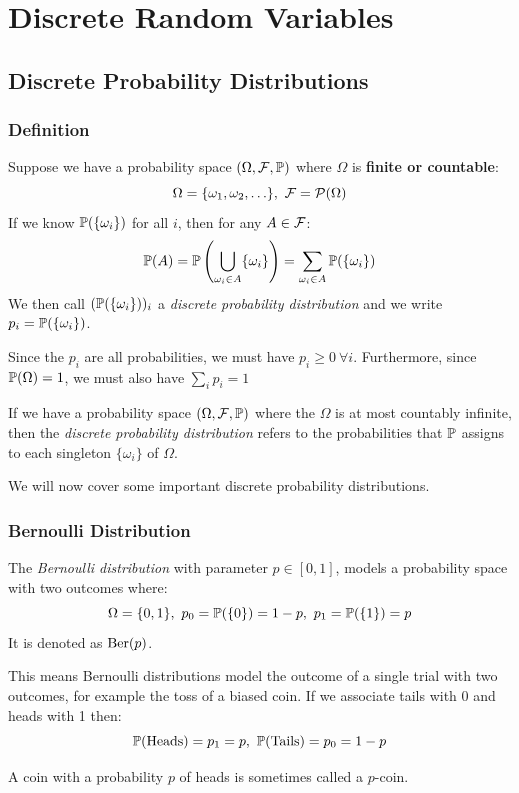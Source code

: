 \documentclass[../main.tex]{subfiles}
\begin{document}
\chapter{Discrete Random Variables}
\section{Discrete Probability Distributions}
\subsection{Definition}
\begin{definition}
  Suppose we have a probability space $(\Omega, \salg, \P)$ where $\Omega$ is \textbf{finite or countable}:
  \[
    \Omega = \{\omega_1, \omega_2, \ldots\},\ \salg = \powerset{\Omega}
  \]
  If we know $\P(\{\omega_i\})$ for all $i$, then for any $A \in \salg$:
  \[
    \P(A) = \P\left(\bigcup_{\omega_i \in A} \{\omega_i\}\right) = \sum_{\omega_i \in A} \P(\{\omega_i\})
  \]
  We then call $(\P(\{\omega_i\}))_i$ a \textit{discrete probability distribution} and we write $p_i = \P(\{\omega_i\})$.
\end{definition}
Since the $p_i$ are all probabilities, we must have $p_i \geq 0\ \forall i$.
Furthermore, since $\P(\Omega) = 1$, we must also have $\sum_{i} p_i = 1$
\begin{remark}[Summary]
   If we have a probability space $(\Omega, \salg, \P)$ where the $\Omega$ is at most countably infinite, then the \textit{discrete probability distribution} refers to the probabilities that $\P$ assigns to each singleton $\{\omega_i\}$ of $\Omega$.
\end{remark}
We will now cover some important discrete probability distributions.
\subsection{Bernoulli Distribution}
\label{bernoulliDist}
\begin{definition}
  The \textit{Bernoulli distribution} with parameter $p \in [0, 1]$, models a probability space with two outcomes where:
  \[
    \Omega = \{0, 1\},\ p_0 = \P(\{0\}) = 1 - p,\ p_1 = \P(\{1\}) = p
  \]
  It is denoted as $\ber(p)$.
\end{definition}
This means Bernoulli distributions model the outcome of a single trial with two outcomes, for example the toss of a biased coin.
If we associate tails with 0 and heads with 1 then:
\[
  \P(\text{Heads}) = p_1 = p,\ \P(\text{Tails}) = p_0 = 1 - p
\]
\begin{remark}
  A coin with a probability $p$ of heads is sometimes called a $p$-coin.
\end{remark}
\end{document}
